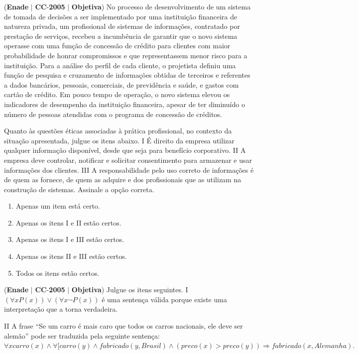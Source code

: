 \documentclass{exam}
\begin{document}
\begin{questions}
\question (\textbf{Enade} $|$ \textbf{CC}-\textbf{2005} $|$ \textbf{Objetiva})
No processo de desenvolvimento de um sistema de
tomada de decisões a ser implementado por uma
instituição financeira de natureza privada, um profissional
de sistemas de informações, contratado por prestação de
serviços, recebeu a incumbência de garantir que o novo
sistema operasse com uma função de concessão de crédito
para clientes com maior probabilidade de honrar
compromissos e que representassem menor risco para a
instituição. Para a análise do perfil de cada cliente, o
projetista definiu uma função de pesquisa e cruzamento
de informações obtidas de terceiros e referentes a dados
bancários, pessoais, comerciais, de previdência e saúde, e
gastos com cartão de crédito. Em pouco tempo de
operação, o novo sistema elevou os indicadores de
desempenho da instituição financeira, apesar de ter
diminuído o número de pessoas atendidas com o
programa de concessão de créditos.

Quanto às questões éticas associadas à prática profissional, no
contexto da situação apresentada, julgue os itens abaixo.
I É direito da empresa utilizar qualquer informação
disponível, desde que seja para benefício corporativo.
II A empresa deve controlar, notificar e solicitar
consentimento para armazenar e usar informações dos
clientes.
III A responsabilidade pelo uso correto de informações é de
quem as fornece, de quem as adquire e dos profissionais que
as utilizam na construção de sistemas.
Assinale a opção correta.
	\begin{enumerate}[label=\alph*)]
		\item  Apenas um item está certo.
		\item  Apenas os itens I e II estão certos.
		\item  Apenas os itens I e III estão certos.
		\item  Apenas os itens II e III estão certos.
		\item  Todos os itens estão certos.
	\end{enumerate}

\question (\textbf{Enade} $|$ \textbf{CC}-\textbf{2005} $|$ \textbf{Objetiva})
Julgue os itens seguintes.
I $(\forall x P(x)) \vee (\forall x \neg P(x)) $ é uma sentença válida porque existe
uma interpretação que a torna verdadeira.

II A frase “Se um carro é mais caro que todos os carros
nacionais, ele deve ser alemão” pode ser traduzida pela
seguinte sentença: $\forall x carro(x) \wedge \forall [carro(y) \wedge fabricado(y,Brasil) \wedge (preco(x) > preco(y)) \Rightarrow fabricado(x, Alemanha). $


\end{questions}
\end{document}
